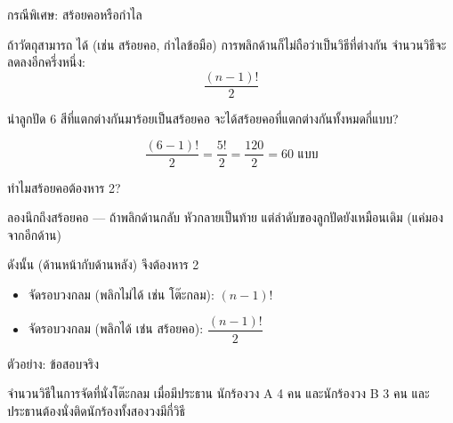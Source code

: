 \documentclass[11pt, aspectratio=169]{beamer}
\begin{document}
\begin{frame}{กรณีพิเศษ: สร้อยคอหรือกำไล}
  \begin{explanation}[ข้อสังเกต]
    ถ้าวัตถุสามารถ  ได้ (เช่น สร้อยคอ, กำไลข้อมือ)
    การพลิกด้านก็ไม่ถือว่าเป็นวิธีที่ต่างกัน
    จำนวนวิธีจะลดลงอีกครึ่งหนึ่ง:
    \[
      \frac{(n-1)!}{2}
    \]
  \end{explanation}

  \begin{exambox}
    นำลูกปัด 6 สีที่แตกต่างกันมาร้อยเป็นสร้อยคอ จะได้สร้อยคอที่แตกต่างกันทั้งหมดกี่แบบ?

    \medskip
    \[
      \frac{(6-1)!}{2} = \frac{5!}{2} = \frac{120}{2} = 60 \text{ แบบ}
    \]
  \end{exambox}
\end{frame}

\begin{frame}{ทำไมสร้อยคอต้องหาร 2?}
  \begin{intuition}
    ลองนึกถึงสร้อยคอ — ถ้าพลิกด้านกลับ หัวกลายเป็นท้าย
    แต่ลำดับของลูกปัดยังเหมือนเดิม (แค่มองจากอีกด้าน)

    \medskip
    ดังนั้น  (ด้านหน้ากับด้านหลัง) จึงต้องหาร 2
  \end{intuition}

  \begin{explanation}[สรุปสูตร]
    \begin{itemize}
      \item จัดรอบวงกลม (พลิกไม่ได้ เช่น โต๊ะกลม): \quad $(n-1)!$
      \item จัดรอบวงกลม (พลิกได้ เช่น สร้อยคอ): \quad $\dfrac{(n-1)!}{2}$
    \end{itemize}
  \end{explanation}
\end{frame}

\begin{frame}[t]{ตัวอย่าง: ข้อสอบจริง}
  \begin{exambox}[โจทย์ปี 67 ข้อ 24]
    จำนวนวิธีในการจัดที่นั่งโต๊ะกลม เมื่อมีประธาน นักร้องวง A 4 คน และนักร้องวง B 3 คน และประธานต้องนั่งติดนักร้องทั้งสองวงมีกี่วิธี 
  \end{exambox}

  \vspace{\fill}
\end{frame}

\end{document}
